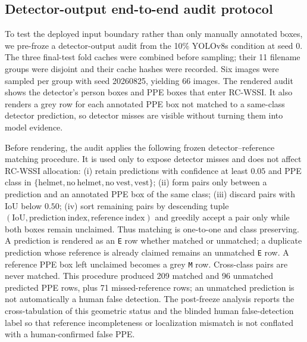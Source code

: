 \documentclass[iicol,pdflatex,sn-mathphys-num]{sn-jnl}
\begin{document}
\subsection{Detector-output end-to-end audit protocol}\label{sec:endtoendprotocol}
To test the deployed input boundary rather than only manually annotated boxes, we pre-froze a detector-output audit from the 10\% YOLOv8s condition at seed 0. The three final-test fold caches were combined before sampling; their 11 filename groups were disjoint and their cache hashes were recorded. Six images were sampled per group with seed 20260825, yielding 66 images. The rendered audit shows the detector's person boxes and PPE boxes that enter RC-WSSI. It also renders a grey row for each annotated PPE box not matched to a same-class detector prediction, so detector misses are visible without turning them into model evidence.

Before rendering, the audit applies the following frozen detector--reference matching procedure. It is used only to expose detector misses and does not affect RC-WSSI allocation: (i) retain predictions with confidence at least $0.05$ and PPE class in $\{\mathrm{helmet},\mathrm{no\ helmet},\mathrm{no\ vest},\mathrm{vest}\}$; (ii) form pairs only between a prediction and an annotated PPE box of the same class; (iii) discard pairs with IoU below $0.50$; (iv) sort remaining pairs by descending tuple $(\mathrm{IoU},\mathrm{prediction\ index},\mathrm{reference\ index})$ and greedily accept a pair only while both boxes remain unclaimed. Thus matching is one-to-one and class preserving. A prediction is rendered as an \texttt{E} row whether matched or unmatched; a duplicate prediction whose reference is already claimed remains an unmatched \texttt{E} row. A reference PPE box left unclaimed becomes a grey \texttt{M} row. Cross-class pairs are never matched. This procedure produced 209 matched and 96 unmatched predicted PPE rows, plus 71 missed-reference rows; an unmatched prediction is not automatically a human false detection. The post-freeze analysis reports the cross-tabulation of this geometric status and the blinded human false-detection label so that reference incompleteness or localization mismatch is not conflated with a human-confirmed false PPE.
\end{document}
